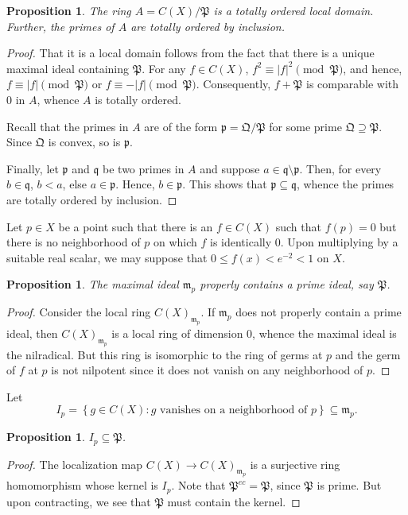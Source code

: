 \documentclass[12pt]{article}
\theoremstyle{thmstyle}
\newtheorem{proposition}[theorem]{Proposition}
\theoremstyle{defstyle}
\newcommand{\frakm}{\mathfrak{m}} %
\newcommand{\frakp}{\mathfrak{p}} %
\newcommand{\frakq}{\mathfrak{q}} %
\newcommand{\frakP}{\mathfrak{P}} %
\newcommand{\frakQ}{\mathfrak{Q}} %
\renewcommand{\le}{\leqslant}
\begin{document}
\begin{proposition}
    The ring $A = C(X)/\frakP$ is a totally ordered local domain. Further, the primes of $A$ are totally ordered by inclusion.
\end{proposition}
\begin{proof}
    That it is a local domain follows from the fact that there is a unique maximal ideal containing $\frakP$. For any $f\in C(X)$, $f^2\equiv |f|^2\pmod\frakP$, and hence, $f\equiv |f|\pmod\frakP$ or $f\equiv -|f|\pmod\frakP$. Consequently, $f + \frakP$ is comparable with $0$ in $A$, whence $A$ is totally ordered.

    Recall that the primes in $A$ are of the form $\frakp = \frakQ/\frakP$ for some prime $\frakQ\supseteq\frakP$. Since $\frakQ$ is convex, so is $\frakp$.

    Finally, let $\frakp$ and $\frakq$ be two primes in $A$ and suppose $a\in\frakq\setminus\frakp$. Then, for every $b\in\frakq$, $b < a$, else $a\in\frakp$. Hence, $b\in\frakp$. This shows that $\frakp\subseteq\frakq$, whence the primes are totally ordered by inclusion.
\end{proof}


Let $p\in X$ be a point such that there is an $f\in C(X)$ such that $f(p) = 0$ but there is no neighborhood of $p$ on which $f$ is identically $0$. Upon multiplying by a suitable real scalar, we may suppose that $0\le f(x) < e^{-2} < 1$ on $X$.

\begin{proposition}
    The maximal ideal $\frakm_p$ properly contains a prime ideal, say $\frakP$.
\end{proposition}
\begin{proof}
    Consider the local ring $C(X)_{\frakm_p}$. If $\frakm_p$ does not properly contain a prime ideal, then $C(X)_{\frakm_p}$ is a local ring of dimension $0$, whence the maximal ideal is the nilradical. But this ring is isomorphic to the ring of germs at $p$ and the germ of $f$ at $p$ is not nilpotent since it does not vanish on any neighborhood of $p$.
\end{proof}

Let 
\begin{equation*}
    I_p = \left\{g\in C(X)\colon g\text{ vanishes on a neighborhood of }p\right\}\subseteq\frakm_p.
\end{equation*}

\begin{proposition}
    $I_p\subseteq\frakP$.
\end{proposition}
\begin{proof}
    The localization map $C(X)\to C(X)_{\frakm_p}$ is a surjective ring homomorphism whose kernel is $I_p$. Note that $\frakP^{ec} = \frakP$, since $\frakP$ is prime. But upon contracting, we see that $\frakP$ must contain the kernel.
\end{proof}
\end{document}
